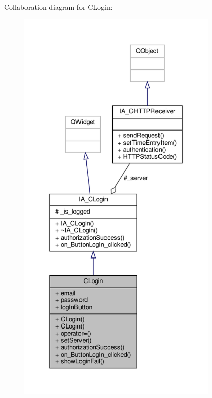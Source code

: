 Collaboration diagram for C\+Login\+:
\nopagebreak
\begin{figure}[H]
\begin{center}
\leavevmode
\includegraphics[height=550pt]{classCLogin__coll__graph}
\end{center}
\end{figure}
